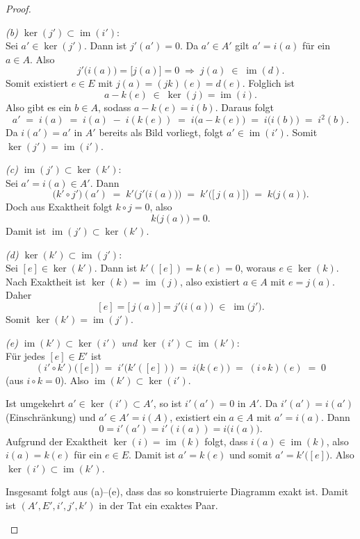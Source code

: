 \documentclass[12pt, hidelinks]{article}
\numberwithin{conj}{section}
\newcommand{\ima}{\operatorname{im}}
\begin{document}
\begin{proof}
\begin{enumerate}[nolistsep]
        \emph{(b) $\ker(j') \subset \ima(i')$}:\\
        Sei $a' \in \ker(j')$. Dann ist $j'(a') = 0$. Da $a' \in A'$ gilt $a' = i(a)$ für ein $a \in A$. Also
        \[
            j'\bigl(i(a)\bigr) = \bigl[j(a)\bigr] = 0 
            \;\Longrightarrow\;
            j(a) \;\in\; \ima(d).
        \]
        Somit existiert $e \in E$ mit $j(a) = (jk)(e) = d(e)$. Folglich ist
        \[
            a - k(e) \;\in\; \ker(j) = \ima(i).
        \]
        Also gibt es ein $b \in A$, sodass $a - k(e) = i(b)$. Daraus folgt
        \[
            a' \;=\; i(a)
            \;=\; i(a) \;-\; i(k(e)) \;=\; i\bigl(a - k(e)\bigr)
            \;=\; i\bigl(i(b)\bigr)
            \;=\; i^2(b).
        \]
        Da $i(a') = a'$ in $A'$ bereits als Bild vorliegt, folgt $a' \in \ima(i')$. Somit $\ker(j') = \ima(i')$.

        \emph{(c) $\ima(j') \subset \ker(k')$}:\\
        Sei $a' = i(a) \in A'$. Dann
        \[
            \bigl(k' \circ j'\bigr)(a')
            \;=\;
            k'\bigl(j'\bigl(i(a)\bigr)\bigr)
            \;=\;
            k'\bigl([\,j(a)\bigr])
            \;=\;
            k\bigl(j(a)\bigr).
        \]
        Doch aus Exaktheit folgt $k \circ j = 0$, also
        \[
            k\bigl(j(a)\bigr) = 0.
        \]
        Damit ist $\ima(j') \subset \ker(k')$.

        \emph{(d) $\ker(k') \subset \ima(j')$}:\\
        Sei $[e] \in \ker(k')$. Dann ist $k'( [e] ) = k(e) = 0$, woraus $e \in \ker(k)$. Nach Exaktheit ist $\ker(k) = \ima(j)$, also existiert $a \in A$ mit $e = j(a)$. Daher
        \[
            [e] = [\,j(a)\bigr] = j'\bigl(i(a)\bigr) \;\in\; \ima\bigl(j'\bigr).
        \]
        Somit $\ker(k') = \ima(j')$.

        \emph{(e) $\ima(k') \subset \ker(i')$ und $\ker(i') \subset \ima(k')$}:\\
        Für jedes $[e] \in E'$ ist
        \[
            (i' \circ k')\bigl([e]\bigr)
            \;=\;
            i'\bigl(k'( [e] )\bigr)
            \;=\;
            i\bigl(k(e)\bigr)
            \;=\;
            (i \circ k)(e)
            \;=\;
            0
        \]
        (aus $i \circ k = 0$). Also $\ima(k') \subset \ker(i')$.

        Ist umgekehrt $a' \in \ker(i') \subset A'$, so ist $i'(a') = 0$ in $A'$. Da $i'(a') = i(a')$ (Einschränkung) und $a' \in A' = i(A)$, existiert ein $a \in A$ mit $a' = i(a)$. Dann
        \[
            0 = i'(a') = i'(i(a)) = i\bigl(i(a)\bigr).
        \]
        Aufgrund der Exaktheit $\ker(i) = \ima(k)$ folgt, dass $i(a) \in \ima(k)$, also $i(a) = k(e)$ für ein $e \in E$. Damit ist $a' = k(e)$ und somit $a' = k'\bigl([e]\bigr)$. Also $\ker(i') \subset \ima(k')$. 

        Insgesamt folgt aus (a)--(e), dass das so konstruierte Diagramm exakt ist. Damit ist $(A', E', i', j', k')$ in der Tat ein exaktes Paar.
    \end{enumerate}
\end{proof}
\end{document}
